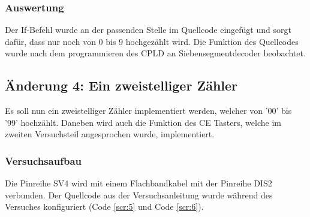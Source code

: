 \documentclass[12pt,a4paper]{article}
\begin{document}
\subsubsection*{Auswertung}
Der If-Befehl wurde an der passenden Stelle im Quellcode eingefügt und sorgt dafür, dass nur noch von 0 bis 9 hochgezählt wird. Die Funktion des Quellcodes wurde nach dem programmieren des CPLD an Siebensegmentdecoder beobachtet.
\subsection{Änderung 4: Ein zweistelliger Zähler}
Es soll nun ein zweistelliger Zähler implementiert werden, welcher von '00' bis '99' hochzählt. Daneben wird auch die Funktion des CE Tasters, welche im zweiten Versuchsteil angesprochen wurde, implementiert.
\subsubsection*{Versuchsaufbau}
Die Pinreihe SV4 wird mit einem Flachbandkabel mit der Pinreihe DIS2 verbunden.
Der Quellcode aus der Versuchsanleitung wurde während des Versuches konfiguriert (Code \ref{scr:5} und Code \ref{scr:6}).
\end{document}

